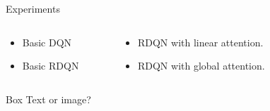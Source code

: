 \documentclass[final]{beamer}
\newlength{\sepwid}
\newlength{\onecolwid}
\newlength{\twocolwid}
\begin{document}
\begin{frame}[t]
\begin{columns}[t]
\begin{column}{\twocolwid}

\begin{column}{\twocolwid}

\begin{block}{Experiments}
\end{block}

\end{column}

\begin{columns}[t,totalwidth=\twocolwid] %

\begin{column}{\onecolwid} %

\begin{itemize}
    \item Basic DQN
    \item Basic RDQN
\end{itemize}


\end{column} %

\begin{column}{\onecolwid} %

\begin{itemize}
    \item RDQN with linear attention.
    \item RDQN with global attention.
\end{itemize}


\end{column} %

\end{columns} %

\begin{alertblock}{Box}
    Text or image?
\end{alertblock} 

\end{column} %

\begin{column}{\sepwid}\end{column} %


\end{columns}
\end{frame}
\end{document}
